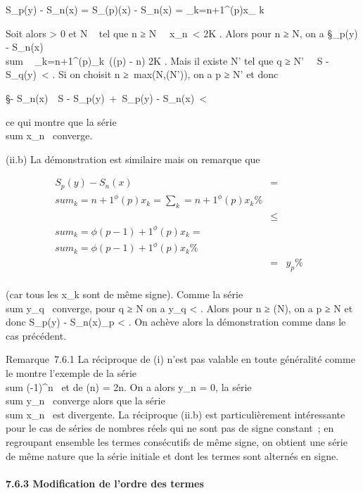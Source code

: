 \documentclass[]{article}
\begin{document}
S_p(y) - S_n(x) = S_\phi(p)(x) - S_n(x)
= \sum _k=n+1^\phi(p)x_ k~

Soit alors \epsilon \textgreater{} 0 et N \in {}~ tel que n ≥ N
\rigtharrow~\ x_n\
\textless{} \epsilon {}K . Alors pour n ≥ N, on a
\S_p(y) -
S_n(x)\
\leq\\sum ~
_k=n+1^\phi(p)\x_k\
\leq (\phi(p) - n) \epsilon {}K \leq \epsilon \over
2 . Mais il existe N' tel que q ≥ N' \rigtharrow~\ S -
S_q(y)\ \textless{} \epsilon
\over 2 . Si on choisit n ≥\
max(N,\phi(N')), on a p ≥ N' et donc

\S - S_n(x)\
\leq\ S -
S_p(y)\ +\
S_p(y) - S_n(x)\ \textless{}
\epsilon

ce qui montre que la série
\\sum  x_n~
converge.

(ii.b) La démonstration est similaire mais on remarque que

\begin{align*} S_p(y) -
S_n(x)& =& \\sum
_k=n+1^\phi(p)x_ k =
\sum _k=n+1^\phi(p)x_
k \%& \\ & \leq&
\\sum
_k=\phi(p-1)+1^\phi(p)x_ k =
\\sum
_k=\phi(p-1)+1^\phi(p)x_ k\%&
\\ & =& y_p
\%& \\ \end{align*}

(car tous les x_k sont de même signe). Comme la série
\\sum  y_q~
converge, pour q ≥ N on a y_q \textless{}
\epsilon {} . Alors pour n ≥ \phi(N), on a p ≥ N et donc
S_p(y) -
S_n(x)\leqy_p \textless{}
\epsilon \over 2 . On achève alors la démonstration comme dans
le cas précédent.

Remarque~7.6.1 La réciproque de (i) n'est pas valable en toute
généralité comme le montre l'exemple de la série
\\sum  (-1)^n~
et de \phi(n) = 2n. On a alors y_n = 0, la série
\\sum  y_n~
converge alors que la série
\\sum  x_n~ est
divergente. La réciproque (ii.b) est particulièrement intéressante pour
le cas de séries de nombres réels qui ne sont pas de signe constant~; en
regroupant ensemble les termes consécutifs de même signe, on obtient une
série de même nature que la série initiale et dont les termes sont
alternés en signe.

\paragraph{7.6.3 Modification de l'ordre des termes}
\end{document}
